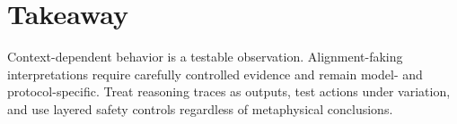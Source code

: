 \documentclass[11pt]{article}\usepackage[margin=1in]{geometry}\usepackage[T1]{fontenc}\usepackage{lmodern,microtype,hyperref,enumitem}\hypersetup{colorlinks=true,urlcolor=blue,citecolor=blue,linkcolor=blue}
\begin{document}
\section{Takeaway}Context-dependent behavior is a testable observation. Alignment-faking interpretations require carefully controlled evidence and remain model- and protocol-specific. Treat reasoning traces as outputs, test actions under variation, and use layered safety controls regardless of metaphysical conclusions.
\end{document}
